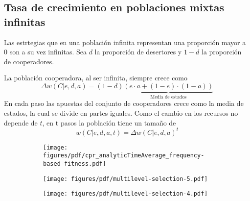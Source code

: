 \documentclass[a4paper,10pt]{article}
\begin{document}
\subsection{Tasa de crecimiento en poblaciones mixtas infinitas}

Las estrtegias que en una población infinita representan una proporción mayor a $0$ son a su vez infinitas.
Sea $d$ la proporción de desertores y $1-d$ la proporción de cooperadores.

% 

La población cooperadora, al ser infinita, siempre crece como
\begin{equation}
\Delta w(C|e,d,a) = (1-d) \underbrace{(e\cdot a + (1-e)\cdot(1-a))}_{\text{Media de estados}}
\end{equation}
En cada paso las apuestas del conjunto de cooperadores crece como la media de estados, la cual se divide en partes iguales.
Como el cambio en los recursos no depende de $t$, en t pasos la población tiene un tamaño de
\begin{equation}
w(C|e,d,a,t) = \Delta w(C|e,d,a)^t 
\end{equation}


\begin{figure}[H]
    \centering
    \begin{subfigure}[b]{0.66\textwidth}
    \texttt{[image: figures/pdf/cpr\_analyticTimeAverage\_frequency-based-fitness.pdf]}
    \end{subfigure}
    \caption{
    }
    \label{fig:cpr_analyticTimeAverage_frequency-based-fitness}
\end{figure}


\begin{figure}[H]
    \centering
    \begin{subfigure}[b]{0.66\textwidth}
    \texttt{[image: figures/pdf/multilevel-selection-5.pdf]}
    \end{subfigure}
    \caption{
    }
    \label{fig:multilevel-selection-5}
\end{figure}

\begin{figure}[H]
    \centering
    \begin{subfigure}[b]{0.66\textwidth}
    \texttt{[image: figures/pdf/multilevel-selection-4.pdf]}
    \end{subfigure}
    \caption{
    }
    \label{fig:multilevel-selection-4}
\end{figure}
\end{document}
